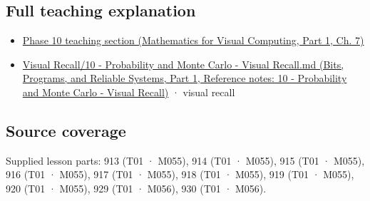 \subsection{Full teaching explanation}\label{appendix-54c383df9992-full-teaching-explanation}

\hypertarget{appendix-54c383df9992-full-teaching-explanation}{}

\begin{itemize}
\tightlist
\item
  \href{../02-Mathematics-for-Visual-Computing-P01/main.pdf\#nameddest=02-foundations-ii-ch023-expected-values-describe-centers-covariance-describes-dependence}{Phase 10 teaching section (Mathematics for Visual Computing, Part 1, Ch. 7)}
\item
  \href{../01-Bits-Programs-and-Reliable-Systems-P01/main.pdf\#nameddest=appendix-cb5af353ef77}{Visual Recall/10 - Probability and Monte Carlo - Visual Recall.md (Bits, Programs, and Reliable Systems, Part 1, Reference notes: 10 - Probability and Monte Carlo - Visual Recall)} · visual recall
\end{itemize}

\subsection{Source coverage}\label{appendix-54c383df9992-source-coverage}

\hypertarget{appendix-54c383df9992-source-coverage}{}

Supplied lesson parts: 913 (T01 · M055), 914 (T01 · M055), 915 (T01 · M055), 916 (T01 · M055), 917 (T01 · M055), 918 (T01 · M055), 919 (T01 · M055), 920 (T01 · M055), 929 (T01 · M056), 930 (T01 · M056).
